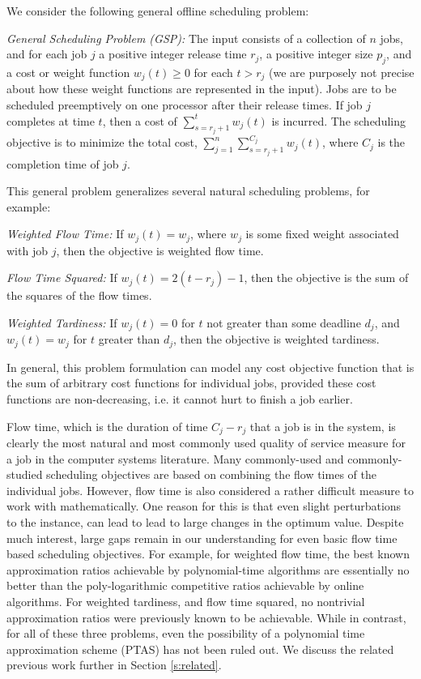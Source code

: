 \documentclass[11pt]{article}
\begin{document}
We consider the following general offline scheduling problem:

\medskip
{\em General Scheduling Problem (GSP):}
The input consists of a collection of $n$ jobs, and for each job $j$
a positive integer release time $r_j$,
a positive integer size $p_j$, 
and a cost or weight function $w_j(t) \geq 0$ for each $t > r_j$ 
(we are purposely not precise about how these weight functions are represented
in the input). 
Jobs are to be scheduled preemptively on
one processor after their release times.  If job $j$ completes at time $t$, then a
cost of $\sum_{s=r_j +1}^t w_j(t) $ is incurred. The scheduling objective is to minimize
the total cost, $\sum_{j=1}^n \sum_{s=r_j +1}^{C_j} w_j(t) $, where $C_j$ is the completion
time of job $j$.




This general problem generalizes several natural scheduling problems, for example:

\medskip
{\em Weighted Flow Time:}
If $w_j(t)  = w_j$, where $w_j$ is some fixed 
weight associated with job $j$, then the objective is weighted flow time.

\smallskip

{\em Flow Time Squared:}
If $w_j(t) = 2(t-r_j) -1$, then the objective is the sum of the squares of the flow times. 

\smallskip

{\em Weighted Tardiness:}
If $w_j(t) = 0$ for $t$ not greater than some deadline $d_j$,
and $w_j(t) = w_j$ for $t$ greater than $d_j$,
then the objective is weighted tardiness.
\medskip


In general, this problem formulation can model any cost objective function that is the 
sum of arbitrary cost functions for individual jobs, provided these cost functions are non-decreasing, i.e. it cannot hurt to finish a job earlier.

Flow time, which is the duration of time $C_j - r_j$ 
that a job is in the system,
is clearly the most natural and most commonly used quality of service measure for a job
in the computer systems literature.
Many commonly-used and commonly-studied scheduling objectives are based on combining
the flow times of the individual jobs.
However, flow time is also considered a rather difficult measure to work with mathematically. 
One reason for this is that even slight perturbations to the instance, can lead to
lead to large changes in the optimum value. 
Despite much interest, large gaps remain in our understanding for even basic 
flow time based scheduling objectives.
For example, for weighted flow time, the best known approximation ratios achievable by
polynomial-time algorithms are essentially no better than the poly-logarithmic 
competitive ratios achievable by online algorithms. 
For weighted tardiness, and flow time squared, no nontrivial approximation ratios were 
previously known
to be achievable.
While in contrast, for all of these three problems,
even the possibility of a polynomial time approximation scheme (PTAS) 
has not been ruled out.
We discuss the related previous work further in Section \ref{s:related}.
\end{document}
